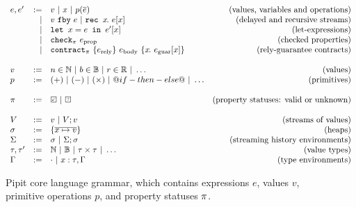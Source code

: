 
\begin{figure}
  \[
  \begin{array}{lrlr}
    e, e' & := & v ~|~ x ~|~ p(\ov{e}) & \mbox{(values, variables and operations)} \\
          & | & \xfby{v}{e} ~|~ \xrec{x}{e[x]} & \mbox{(delayed and recursive streams)} \\ %
          & | & \xlet{x}{e}{e'[x]} & \mbox{(let-expressions)}\\
          & | & \xcheckP{\PStatus}{e_{\text{prop}}} & \mbox{(checked properties)} \\
          & | & \xcontractP{\PStatus}{\erely}{\ebody}{\rawbind{x}{\eguar[x]}} & \mbox{(rely-guarantee contracts)} \\
    \\
    v & := & n \in \mathbb{N} ~|~ b \in \mathbb{B} ~|~ r \in \mathbb{R} ~|~ \hdots  & \mbox{(values)} \\
    p & := & (+) ~|~ (-) ~|~ (\times) ~|~ @if-then-else@ ~|~ \hdots & \mbox{(primitives)} \\
    \\
    \PStatus & := & \PSValid ~|~ \PSUnknown & \mbox{(property statuses: valid or unknown)}\\
    \\
    V & := & v ~|~ V;v & \mbox{(streams of values)} \\
    \sigma & := & \sgl{\ov{x \mapsto v}} & \mbox{(heaps)} \\
    \Sigma & := & \sigma ~|~ \Sigma;\sigma & \mbox{(streaming history environments)} \\
    \tau, \tau' & := & \mathbb{N} ~|~ \mathbb{B} ~|~ \tau \times \tau ~|~ \hdots & \mbox{(value types)} \\
    \Gamma & := & \cdot ~|~ x : \tau, \Gamma & \mbox{(type environments)}  \\
    \end{array}
  \]
  \caption{Pipit core language grammar, which contains expressions $e$, values $v$, primitive operations $p$, and property statuses $\pi$.}
  \label{f:core-grammar}
\end{figure}
